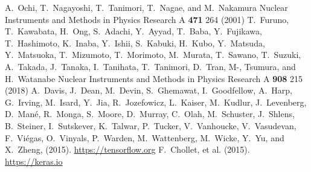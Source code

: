 \documentclass{jps-cp}
\begin{document}
\begin{thebibliography}{9}
  A.~Ochi, T.~Nagayoshi, T.~Tanimori, T.~Nagae, and M.~Nakamura
  Nuclear Instruments and Methods in Physics Research A \textbf{471} 264 (2001)
  T.~Furuno, T.~Kawabata, H.~Ong, S.~Adachi, Y.~Ayyad, T.~Baba, Y.~Fujikawa, T.~Hashimoto, K.~Inaba, Y.~Ishii,
  S.~Kabuki, H.~Kubo, Y.~Matsuda, Y.~Matsuoka, T.~Mizumoto, T.~Morimoto, M.~Murata, T.~Sawano, T.~Suzuki, A.~Takada,
  J.~Tanaka, I.~Tanihata, T.~Tanimori, D.~Tran, M-, Tsumura, and H.~Watanabe
  Nuclear Instruments and Methods in Physics Research A \textbf{908} 215 (2018)
  A.~Davis, J.~Dean, M.~Devin, S.~Ghemawat, I.~Goodfellow, A.~Harp, G.~Irving,
  M.~Isard, Y.~Jia, R.~Jozefowicz, L.~Kaiser, M.~Kudlur, J.~Levenberg,
  D.~Man\'{e}, R.~Monga, S.~Moore, D.~Murray, C.~Olah, M.~Schuster, J.~Shlens,
  B.~Steiner, I.~Sutskever, K.~Talwar, P.~Tucker, V.~Vanhoucke, V.~Vasudevan,
  F.~Vi\'{e}gas, O.~Vinyals, P.~Warden, M.~Wattenberg, M.~Wicke, Y.~Yu, and
  X.~Zheng, (2015).
  \url{https://tensorflow.org}
  F.~Chollet, et al. (2015). \url{https://keras.io}

\end{thebibliography}
\end{document}
